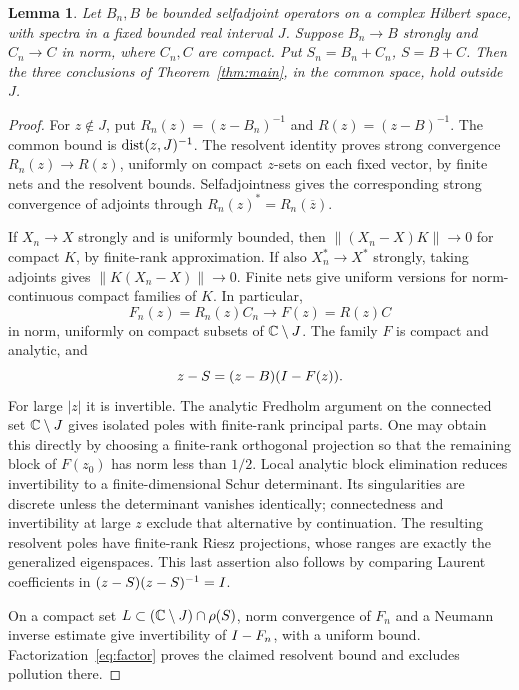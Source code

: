 \documentclass[11pt]{article}
\newtheorem{lemma}[theorem]{Lemma}
\theoremstyle{remark}\newtheorem{remark}[theorem]{Remark}
\begin{document}
\begin{lemma}\label{lem:abstract}
Let $B_n,B$ be bounded selfadjoint operators on a complex Hilbert space, with spectra in a fixed bounded real interval $J$. Suppose $B_n\to B$ strongly and $C_n\to C$ in norm, where $C_n,C$ are compact. Put $S_n=B_n+C_n$, $S=B+C$. Then the three conclusions of Theorem~\ref{thm:main}, in the common space, hold outside $J$.
\end{lemma}
\begin{proof}
For $z\notin J$, put $R_n(z)=(z-B_n)^{-1}$ and $R(z)=(z-B)^{-1}$. The common bound is $\operatorname{dist}(z,J)^{-1}$. The resolvent identity proves strong convergence $R_n(z)\to R(z)$, uniformly on compact $z$-sets on each fixed vector, by finite nets and the resolvent bounds. Selfadjointness gives the corresponding strong convergence of adjoints through $R_n(z)^*=R_n(\overline z)$.

If $X_n\to X$ strongly and is uniformly bounded, then $\|(X_n-X)K\|\to0$ for compact $K$, by finite-rank approximation. If also $X_n^*\to X^*$ strongly, taking adjoints gives $\|K(X_n-X)\|\to0$. Finite nets give uniform versions for norm-continuous compact families of $K$. In particular,
\[
 F_n(z)=R_n(z)C_n\longrightarrow F(z)=R(z)C
\]
in norm, uniformly on compact subsets of $\mathbb C\setminus J$. The family $F$ is compact and analytic, and
\begin{equation}\label{eq:factor}
 z-S=(z-B)(I-F(z)).
\end{equation}
For large $|z|$ it is invertible. The analytic Fredholm argument on the connected set $\mathbb C\setminus J$ gives isolated poles with finite-rank principal parts. One may obtain this directly by choosing a finite-rank orthogonal projection so that the remaining block of $F(z_0)$ has norm less than $1/2$. Local analytic block elimination reduces invertibility to a finite-dimensional Schur determinant. Its singularities are discrete unless the determinant vanishes identically; connectedness and invertibility at large $z$ exclude that alternative by continuation. The resulting resolvent poles have finite-rank Riesz projections, whose ranges are exactly the generalized eigenspaces. This last assertion also follows by comparing Laurent coefficients in $(z-S)(z-S)^{-1}=I$.

On a compact set $L\subset(\mathbb C\setminus J)\cap\rho(S)$, norm convergence of $F_n$ and a Neumann inverse estimate give invertibility of $I-F_n$, with a uniform bound. Factorization~\eqref{eq:factor} proves the claimed resolvent bound and excludes pollution there.


\end{proof}
\end{document}
